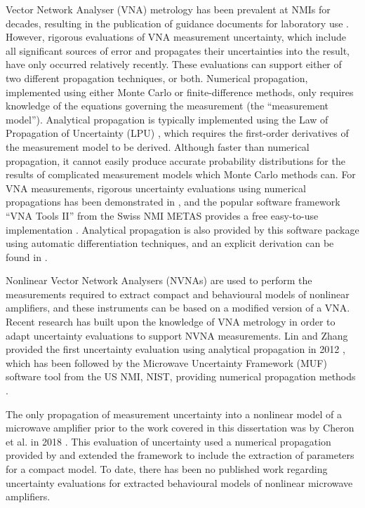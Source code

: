 \documentclass[../thesis/thesis.tex]{subfiles}
\begin{document}
\begin{refsection}
Vector Network Analyser (VNA) metrology has been prevalent at NMIs for decades, resulting in the publication of guidance documents for laboratory use \cite{EA_2000,EURAMET_2011}. However, rigorous evaluations of VNA measurement uncertainty, which include all significant sources of error and propagates their uncertainties into the result, have only occurred relatively recently. These evaluations can support either of two different propagation techniques, or both. Numerical propagation, implemented using either Monte Carlo or finite-difference methods, only requires knowledge of the equations governing the measurement (the ``measurement model''). Analytical propagation is typically implemented using the Law of Propagation of Uncertainty (LPU) \cite{GUM_2008}, which requires the first-order derivatives of the measurement model to be derived. Although faster than numerical propagation, it cannot easily produce accurate probability distributions for the results of complicated measurement models which Monte Carlo methods can. For VNA measurements, rigorous uncertainty evaluations using numerical propagations has been demonstrated in \cite{Hoffman_2007}, and the popular software framework ``VNA Tools II'' from the Swiss NMI METAS provides a free easy-to-use implementation \cite{VNATools}. Analytical propagation is also provided by this software package using automatic differentiation techniques, and an explicit derivation can be found in \cite{Lewandowski_2010B}.

Nonlinear Vector Network Analysers (NVNAs) are used to perform the measurements required to extract compact and behavioural models of nonlinear amplifiers, and these instruments can be based on a modified version of a VNA. Recent research has built upon the knowledge of VNA metrology in order to adapt uncertainty evaluations to support NVNA measurements. Lin and Zhang provided the first uncertainty evaluation using analytical propagation in 2012 \cite{Lin_2012}, which has been followed by the Microwave Uncertainty Framework (MUF) software tool from the US NMI, NIST, providing numerical propagation methods \cite{MUFWebsite,Avolio_2015}.

The only propagation of measurement uncertainty into a nonlinear model of a microwave amplifier prior to the work covered in this dissertation was by Cheron et al. in 2018 \cite{Cheron_2018}. This evaluation of uncertainty used a numerical propagation provided by \cite{MUFWebsite} and extended the framework to include the extraction of parameters for a compact model. To date, there has been no published work regarding uncertainty evaluations for extracted behavioural models of nonlinear microwave amplifiers.


\end{refsection}
\end{document}
